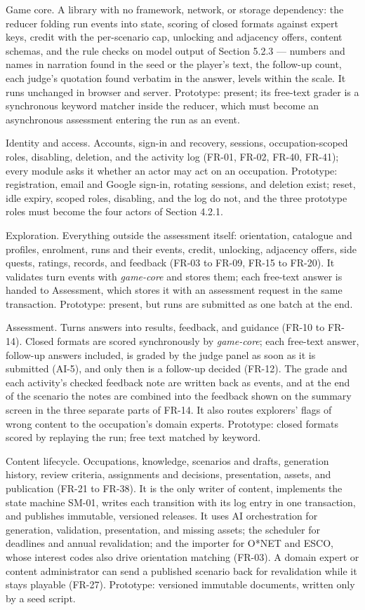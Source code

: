Game core. A library with no framework, network, or storage dependency: the reducer folding run events into state, scoring of closed formats against expert keys, credit with the per-scenario cap, unlocking and adjacency offers, content schemas, and the rule checks on model output of Section 5.2.3 --- numbers and names in narration found in the seed or the player's text, the follow-up count, each judge's quotation found verbatim in the answer, levels within the scale. It runs unchanged in browser and server. Prototype: present; its free-text grader is a synchronous keyword matcher inside the reducer, which must become an asynchronous assessment entering the run as an event.

Identity and access. Accounts, sign-in and recovery, sessions, occupation-scoped roles, disabling, deletion, and the activity log (FR-01, FR-02, FR-40, FR-41); every module asks it whether an actor may act on an occupation. Prototype: registration, email and Google sign-in, rotating sessions, and deletion exist; reset, idle expiry, scoped roles, disabling, and the log do not, and the three prototype roles must become the four actors of Section 4.2.1.

Exploration. Everything outside the assessment itself: orientation, catalogue and profiles, enrolment, runs and their events, credit, unlocking, adjacency offers, side quests, ratings, records, and feedback (FR-03 to FR-09, FR-15 to FR-20). It validates turn events with \textit{game-core} and stores them; each free-text answer is handed to Assessment, which stores it with an assessment request in the same transaction. Prototype: present, but runs are submitted as one batch at the end.

Assessment. Turns answers into results, feedback, and guidance (FR-10 to FR-14). Closed formats are scored synchronously by \textit{game-core}; each free-text answer, follow-up answers included, is graded by the judge panel as soon as it is submitted (AI-5), and only then is a follow-up decided (FR-12). The grade and each activity's checked feedback note are written back as events, and at the end of the scenario the notes are combined into the feedback shown on the summary screen in the three separate parts of FR-14. It also routes explorers' flags of wrong content to the occupation's domain experts. Prototype: closed formats scored by replaying the run; free text matched by keyword.

Content lifecycle. Occupations, knowledge, scenarios and drafts, generation history, review criteria, assignments and decisions, presentation, assets, and publication (FR-21 to FR-38). It is the only writer of content, implements the state machine SM-01, writes each transition with its log entry in one transaction, and publishes immutable, versioned releases. It uses AI orchestration for generation, validation, presentation, and missing assets; the scheduler for deadlines and annual revalidation; and the importer for O*NET and ESCO, whose interest codes also drive orientation matching (FR-03). A domain expert or content administrator can send a published scenario back for revalidation while it stays playable (FR-27). Prototype: versioned immutable documents, written only by a seed script.

